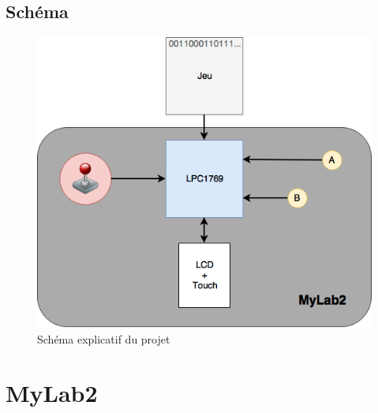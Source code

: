 \documentclass[a4paper]{article}
\begin{document}

\subsection{Schéma}
\begin{figure}[!h]
  \centering
  \includegraphics[scale=0.6]{images/schema_systeme.png}
  \caption{Schéma explicatif du projet}
\end{figure}

\newpage

\section{MyLab2}
\end{document}
